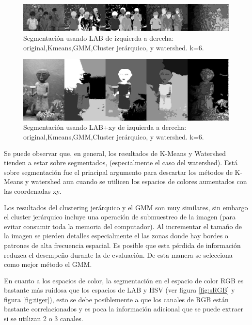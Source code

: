 \documentclass[10pt,twocolumn,letterpaper]{article}
\begin{document}
\begin{figure}
\begin{center}
\includegraphics[width=0.95\linewidth]
                  {img/LABSample.jpg}
\end{center}
  \caption{Segmentación usando LAB de izquierda a derecha: original,Kmeans,GMM,Cluster jerárquico, y watershed. k=6.}
\label{fig:SLAB}
\end{figure}

\begin{figure}
\begin{center}
\includegraphics[width=0.95\linewidth]
                  {img/LABXYSample.jpg}
\end{center}
  \caption{Segmentación usando LAB+xy de izquierda a derecha: original,Kmeans,GMM,Cluster jerárquico, y watershed. k=6.}
\label{fig:SLABXY}
\end{figure}


Se puede observar que, en general, los resultados de K-Means y Watershed tienden a estar sobre segmentados, (especialmente el caso del watershed). Está sobre segmentación fue el principal argumento para descartar los métodos de K-Means y watershed aun cuando se utilicen los espacios de colores aumentados con las coordenadas xy.

Los resultados del clustering jerárquico y el GMM son muy similares, sin embargo el cluster jerárquico incluye una operación de submuestreo de la imagen (para evitar consumir toda la memoria del computador). Al incrementar el tamaño de la imagen se pierden detalles especialmente el las zonas donde hay bordes o patrones de alta frecuencia espacial. Es posible que esta pérdida de información reduzca el desempeño durante la de evaluación. De esta manera se selecciona como mejor método el GMM.

En cuanto a los espacios de color, la segmentación en el espacio de color RGB es bastante más ruidosa que los espacios de LAB y HSV (ver figura \ref{fig:sRGB} y figura \ref{fig:tiger}), esto se debe posiblemente a que los canales de RGB están bastante correlacionados y es poca la información adicional que se puede extraer si se utilizan 2 o 3 canales.
\end{document}
